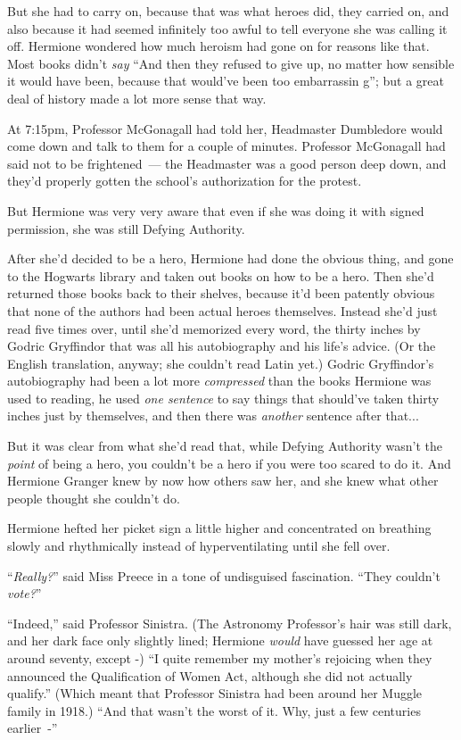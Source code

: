 But she had to carry on, because that was what heroes did, they carried on, and also because it had seemed infinitely too awful to tell everyone she was calling it off. Hermione wondered how much heroism had gone on for reasons like that. Most books didn't \emph{say} ``And then they refused to give up, no matter how sensible it would have been, because that would've been too embarrassin g''; but a great deal of history made a lot more sense that way.

At 7:15pm, Professor McGonagall had told her, Headmaster Dumbledore would come down and talk to them for a couple of minutes. Professor McGonagall had said not to be frightened~--- the Headmaster was a good person deep down, and they'd properly gotten the school's authorization for the protest.

But Hermione was very very aware that even if she was doing it with signed permission, she was still Defying Authority.

After she'd decided to be a hero, Hermione had done the obvious thing, and gone to the Hogwarts library and taken out books on how to be a hero. Then she'd returned those books back to their shelves, because it'd been patently obvious that none of the authors had been actual heroes themselves. Instead she'd just read five times over, until she'd memorized every word, the thirty inches by Godric Gryffindor that was all his autobiography and his life's advice. (Or the English translation, anyway; she couldn't read Latin yet.) Godric Gryffindor's autobiography had been a lot more \emph{compressed} than the books Hermione was used to reading, he used \emph{one sentence} to say things that should've taken thirty inches just by themselves, and then there was \emph{another} sentence after that...

But it was clear from what she'd read that, while Defying Authority wasn't the \emph{point} of being a hero, you couldn't be a hero if you were too scared to do it. And Hermione Granger knew by now how others saw her, and she knew what other people thought she couldn't do.

Hermione hefted her picket sign a little higher and concentrated on breathing slowly and rhythmically instead of hyperventilating until she fell over.

``\emph{Really?}'' said Miss Preece in a tone of undisguised fascination. ``They couldn't \emph{vote?}''

``Indeed,'' said Professor Sinistra. (The Astronomy Professor's hair was still dark, and her dark face only slightly lined; Hermione \emph{would} have guessed her age at around seventy, except -) ``I quite remember my mother's rejoicing when they announced the Qualification of Women Act, although she did not actually qualify.'' (Which meant that Professor Sinistra had been around her Muggle family in 1918.) ``And that wasn't the worst of it. Why, just a few centuries earlier~-''

